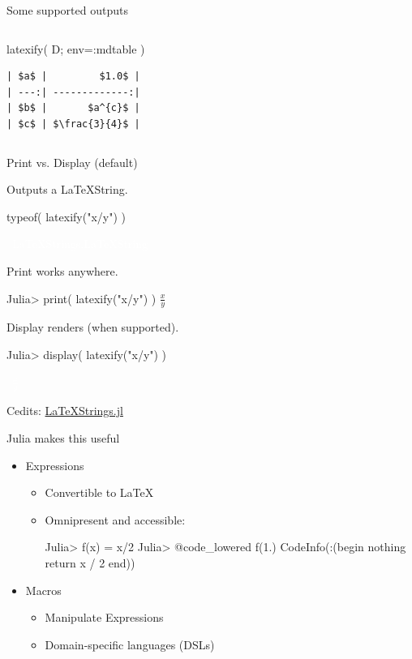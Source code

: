 \documentclass{beamer}
\begin{document}
\begin{frame}[fragile]{Some supported outputs}
\begin{columns}[t]
\begin{column}{0.5\textwidth}
\begin{juliacode}
  latexify( D; env=:mdtable )
\end{juliacode}
  \footnotesize
\begin{verbatim}
| $a$ |         $1.0$ |
| ---:| -------------:|
| $b$ |       $a^{c}$ |
| $c$ | $\frac{3}{4}$ |
\end{verbatim}
\vfill
\end{column}
\end{columns}

\end{frame}


\begin{frame}[fragile]{Print vs. Display (default)}

  \textbullet Outputs a LaTeXString.
  \begin{juliacode}
    typeof( latexify("x/y") )

    ~\large\textcolor{white}{\tiny LaTeXStrings.LaTeXString}~
  \end{juliacode}

  \textbullet Print works anywhere.
  \begin{juliacode}
    Julia> print( latexify("x/y") )
    $\frac{x}{y}$
  \end{juliacode}

  \textbullet Display renders (when supported).
  \begin{juliacode}
    Julia> display( latexify("x/y") )

    ~\large\textcolor{white}{$\frac{x}{y}$}~
  \end{juliacode}


  Cedits: \href{https://github.com/stevengj/LaTeXStrings.jl}{LaTeXStrings.jl}


\end{frame}

\begin{frame}[fragile]{Julia makes this useful}
  \begin{itemize}
    \item Expressions
    \begin{itemize}
      \item Convertible to \LaTeX
      \item Omnipresent and accessible:
\begin{juliacode}
  Julia> f(x) = x/2
  Julia> @code_lowered f(1.)
  CodeInfo(:(begin
      nothing
      return x / 2
    end))
\end{juliacode}
    \end{itemize}

    \item Macros
    \begin{itemize}
      \item Manipulate Expressions
      \item Domain-specific languages (DSLs)
    \end{itemize}

  \end{itemize}

\end{frame}
\end{document}
